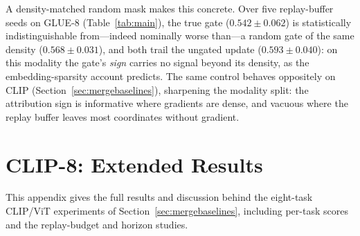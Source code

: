 \documentclass{article} %
\begin{document}
A density-matched random mask makes this concrete. Over five replay-buffer seeds on GLUE-8 (Table~\ref{tab:main}), the true gate ($0.542\pm0.062$) is statistically indistinguishable from---indeed nominally worse than---a random gate of the same density ($0.568\pm0.031$), and both trail the ungated update ($0.593\pm0.040$): on this modality the gate's \emph{sign} carries no signal beyond its density, as the embedding-sparsity account predicts. The same control behaves oppositely on CLIP (Section~\ref{sec:mergebaselines}), sharpening the modality split: the attribution sign is informative where gradients are dense, and vacuous where the replay buffer leaves most coordinates without gradient.


\section{CLIP-8: Extended Results}
\label{app:clip8}
This appendix gives the full results and discussion behind the eight-task CLIP/ViT experiments of Section~\ref{sec:mergebaselines}, including per-task scores and the replay-budget and horizon studies.
\end{document}
